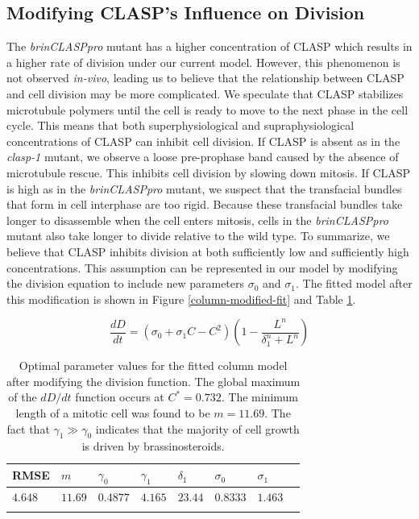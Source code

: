 \documentclass[referee,pdflatex,sn-mathphys-num]{sn-jnl}
\begin{document}
\subsection{Modifying CLASP's Influence on Division} 

The \emph{brinCLASPpro} mutant has a higher concentration of CLASP which results in a higher rate of division under our current model. However, this phenomenon is not observed \emph{in-vivo}, leading us to believe that the relationship between CLASP and cell division may be more complicated. We speculate that CLASP stabilizes microtubule polymers until the cell is ready to move to the next phase in the cell cycle. This means that both superphysiological and supraphysiological concentrations of CLASP can inhibit cell division. If CLASP is absent as in the \emph{clasp-1} mutant, we observe a loose pre-prophase band \cite{ambrose2007} caused by the absence of microtubule rescue. This inhibits cell division by slowing down mitosis. If CLASP is high as in the \emph{brinCLASPpro} mutant, we suspect that the transfacial bundles that form in cell interphase are too rigid. Because these transfacial bundles take longer to disassemble when the cell enters mitosis, cells in the \emph{brinCLASPpro} mutant also take longer to divide relative to the wild type. To summarize, we believe that CLASP inhibits division at both sufficiently low and sufficiently high concentrations. This assumption can be represented in our model by modifying the division equation to include new parameters $\sigma_{0}$ and $\sigma_{1}$. The fitted model after this modification is shown in Figure \ref{column-modified-fit} and Table \ref{column-modified-parameters}.

\begin{equation}
\label{division-modified}
\frac{dD}{dt} = \left( \sigma_{0} + \sigma_{1}C - C^{2} \right)\left( 1 - \frac{L^{n}}{\delta_{1}^{n} + L^{n}} \right) 
\end{equation}


\begin{table}[!ht]
\centering
\caption{Optimal parameter values for the fitted column model after modifying the division function. The global maximum of the $dD/dt$ function occurs at $C^{*} = 0.732$. The minimum length of a mitotic cell was found to be $m = 11.69$. The fact that $\gamma_{1} \gg \gamma_{0}$ indicates that the majority of cell growth is driven by brassinosteroids. }
\label{column-modified-parameters}
\begin{tabular}{@{}llllllll@{}}
\toprule
RMSE & $m$ & $\gamma_{0}$ & $\gamma_{1}$ & $\delta_{1}$ & $\sigma_{0}$ & $\sigma_{1}$ \\
\midrule
$4.648$ & $11.69$ & $0.4877$ & $4.165$ & $23.44$ & $0.8333$ & $1.463$ \\
\botrule
\end{tabular}
\end{table}
\end{document}
